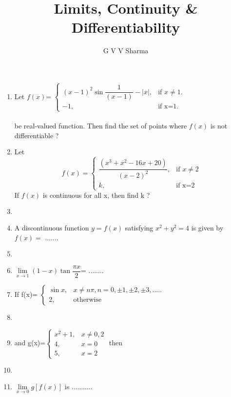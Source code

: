 \documentclass[journal,12pt,twocolumn]{IEEEtran}
\begin{document}
\title{Limits, Continuity \& Differentiability}
\author{G V V Sharma}
\maketitle
\begin{enumerate}
\item Let $f(x)$=\resizebox{.33 \textwidth}{!} 
{$\begin{cases}
(x-1)^2\sin \dfrac{1}{(x-1)} - |x|,& \text{if $x\ne 1$}. \\
-1, & \text{if x=1}.
\end{cases}$} \\ 
\\be real-valued function. Then find the set of points where $f(x)$ is not differentiable ?

\item Let\begin{equation*}
f(x)=\begin{cases}
\dfrac{\left(x^3+x^2-16x+20\right)}{\left(x-2\right)^2}, &\text{if $x\ne 2$}\\
k, & \text{if x=2}
\end{cases}
\end{equation*}
If $f(x)$ is continuous for all x, then find k ?

\item[~]\item A discontinuous function $y=f(x)$ satisfying $x^2+y^2=4$ is given by $f(x)=$ .......

\item[~]\item
$\lim\limits_{x \to 1}\left(1-x\right)\tan\dfrac{\pi x}{2} $= ........

\item If f(x)=\resizebox{.34 \textwidth}{!} 
{$\begin{cases}\sin x, & \text{$x \ne n\pi$}, n=0,\pm 1, \pm 2, \pm 3, .....\\ 
2, & \text{otherwise} \end{cases}$} \item[~]\item[~]and g(x)=$\begin{cases}x^2+1, & \text{$x\ne 0,2$}\\ 4,& \text{$x=0$}\\ 5,& \text{$x=2$}\end{cases}$
then \item[~]\item[~]$\lim\limits_{x \to 0}g\left[f(x)\right]$ is ...........


\end{enumerate}
\end{document}
